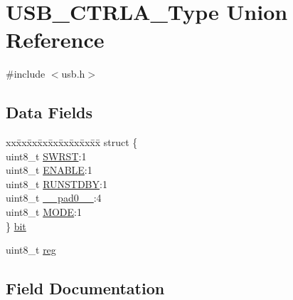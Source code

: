 \hypertarget{union_u_s_b___c_t_r_l_a___type}{}\section{U\+S\+B\+\_\+\+C\+T\+R\+L\+A\+\_\+\+Type Union Reference}
\label{union_u_s_b___c_t_r_l_a___type}


{\ttfamily \#include $<$usb.\+h$>$}

\subsection*{Data Fields}
\begin{DoxyCompactItemize}
\item 
\begin{tabbing}
xx\=xx\=xx\=xx\=xx\=xx\=xx\=xx\=xx\=\kill
struct \{\\
\>uint8\_t \mbox{\hyperlink{union_u_s_b___c_t_r_l_a___type_a9334d5ac0548802c90a8129c52c8e490}{SWRST}}:1\\
\>uint8\_t \mbox{\hyperlink{union_u_s_b___c_t_r_l_a___type_a2b3662f1b123463ae1a23c1f324e5cc5}{ENABLE}}:1\\
\>uint8\_t \mbox{\hyperlink{union_u_s_b___c_t_r_l_a___type_aa24338c5cacc63e3b77adf2dc0938ff6}{RUNSTDBY}}:1\\
\>uint8\_t \mbox{\hyperlink{union_u_s_b___c_t_r_l_a___type_a8b4eebe79ded0459acec2f4950102ba3}{\_\_pad0\_\_}}:4\\
\>uint8\_t \mbox{\hyperlink{union_u_s_b___c_t_r_l_a___type_a43b063261f3aac0bf5ace8e787f72b49}{MODE}}:1\\
\} \mbox{\hyperlink{union_u_s_b___c_t_r_l_a___type_ade27abd39c9eaf382df24760ac09bbbc}{bit}}\\

\end{tabbing}\item 
uint8\+\_\+t \mbox{\hyperlink{union_u_s_b___c_t_r_l_a___type_a9428adc9af4653a2050e2536b55dec8d}{reg}}
\end{DoxyCompactItemize}


\subsection{Field Documentation}
\mbox{\label{union_u_s_b___c_t_r_l_a___type_a8b4eebe79ded0459acec2f4950102ba3}} 
